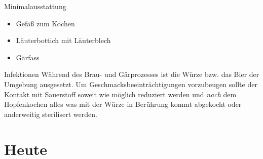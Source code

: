 \documentclass[9pt, ngerman]{beamer}
\begin{document}
\begin{frame}{Minimalausstattung}
  \begin{itemize}
    \item Gefäß zum Kochen
    \item Läuterbottich mit Läuterblech
    \item Gärfass
  \end{itemize}
\end{frame}
\begin{frame}{Infektionen}
  Während des Brau- und Gärprozesses ist die Würze bzw. das Bier der Umgebung
  ausgesetzt. Um Geschmacksbeeinträchtigungen vorzubeugen sollte der Kontakt
  mit Sauerstoff soweit wie möglich reduziert werden und \emph{nach} dem
  Hopfenkochen alles was mit der Würze in Berührung kommt abgekocht oder
  anderweitig sterilisert werden.
\end{frame}

\section{Heute}
\end{document}
